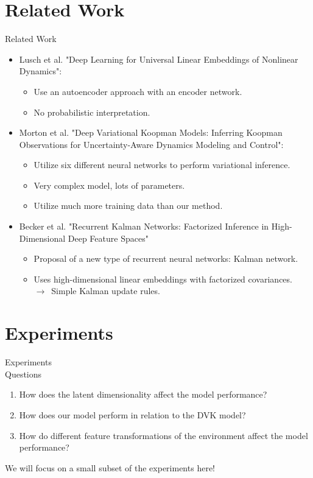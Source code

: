 \documentclass[
	aspectratio=43,
	color={accentcolor=1c},
	logo=false,
	colorframetitle=true,
]{tudabeamer}
\begin{document}
	\section{Related Work}
		\begin{frame}{Related Work}
			\begin{itemize}
				\item<+-> Lusch et al. "Deep Learning for Universal Linear Embeddings of Nonlinear Dynamics":
					\begin{itemize}
						\item Use an autoencoder approach with an encoder network.
						\item No probabilistic interpretation.
				\end{itemize}
				\item<+-> Morton et al. "Deep Variational Koopman Models: Inferring Koopman Observations for Uncertainty-Aware Dynamics Modeling and Control":
					\begin{itemize}
						\item Utilize six different neural networks to perform variational inference.
						\item Very complex model, lots of parameters.
						\item Utilize much more training data than our method.
					\end{itemize}
				\item<+-> Becker et al. "Recurrent Kalman Networks: Factorized Inference in High-Dimensional Deep Feature Spaces"
					\begin{itemize}
						\item Proposal of a new type of recurrent neural networks: Kalman network.
						\item Uses high-dimensional linear embeddings with factorized covariances. \\
							\quad \(\longrightarrow\,\) Simple Kalman update rules.
					\end{itemize}
			\end{itemize}
		\end{frame}

	\section{Experiments}
		\begin{frame}{Experiments \\ Questions}
			\begin{enumerate}
				\item How does the latent dimensionality affect the model performance?
				\item How does our model perform in relation to the DVK model?
				\item How do different feature transformations of the environment affect the model performance?
			\end{enumerate}

			We will focus on a small subset of the experiments here!
		\end{frame}
\end{document}
